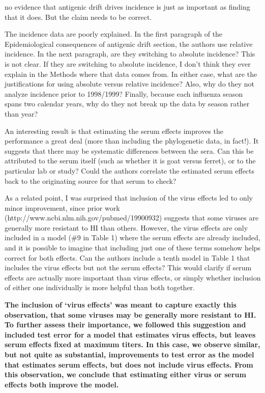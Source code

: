 \documentclass[11pt,oneside,letterpaper]{article}
\begin{document}
no evidence that antigenic drift drives incidence is just as important as finding that it does. But the claim needs to be correct.

The incidence data are poorly explained. In the first paragraph of the Epidemiological consequences of antigenic drift section, the authors use relative incidence. In the next paragraph, are they switching to absolute incidence? This is not clear. If they are switching to absolute incidence, I don't think they ever explain in the Methods where that data comes from. In either case, what are the justifications for using absolute versus relative incidence? Also, why do they not analyze incidence prior to 1998/1999? Finally, because each influenza season spans two calendar years, why do they not break up the data by season rather than year?

An interesting result is that estimating the serum effects improves the performance a great deal (more than including the phylogenetic data, in fact!). It suggests that there may be systematic differences between the sera. Can this be attributed to the serum itself (such as whether it is goat versus ferret), or to the particular lab or study? Could the authors correlate the estimated serum effects back to the originating source for that serum to check? 

As a related point, I was surprised that inclusion of the virus effects led to only minor improvement, since prior work (http://www.ncbi.nlm.nih.gov/pubmed/19900932) suggests that some viruses are generally more resistant to HI than others. However, the virus effects are only included in a model (\#9 in Table 1) where the serum effects are already included, and it is possible to imagine that including just one of these terms somehow helps correct for both effects. Can the authors include a tenth model in Table 1 that includes the virus effects but not the serum effects? This would clarify if serum effects are actually more important than virus effects, or simply whether inclusion of either one individually is more helpful than both together.

\textbf{The inclusion of `virus effects' was meant to capture exactly this observation, that some viruses may be generally more resistant to HI. To further assess their importance, we followed this suggestion and included test error for a model that estimates virus effects, but leaves serum effects fixed at maximum titers. In this case, we observe similar, but not quite as substantial, improvements to test error as the model that estimates serum effects, but does not include virus effects.  From this observation, we conclude that estimating either virus or serum effects both improve the model.}
\end{document}
